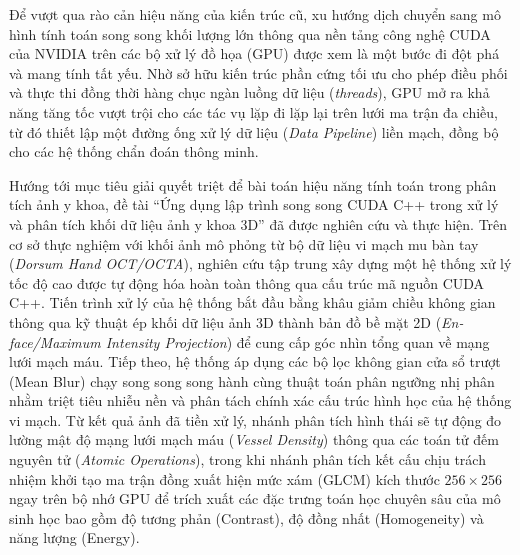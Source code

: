 Để vượt qua rào cản hiệu năng của kiến trúc cũ, xu hướng dịch chuyển sang mô hình tính toán song song khối lượng lớn thông qua nền tảng công nghệ CUDA của NVIDIA trên các bộ xử lý đồ họa (GPU) được xem là một bước đi đột phá và mang tính tất yếu. Nhờ sở hữu kiến trúc phần cứng tối ưu cho phép điều phối và thực thi đồng thời hàng chục ngàn luồng dữ liệu (\textit{threads}), GPU mở ra khả năng tăng tốc vượt trội cho các tác vụ lặp đi lặp lại trên lưới ma trận đa chiều, từ đó thiết lập một đường ống xử lý dữ liệu (\textit{Data Pipeline}) liền mạch, đồng bộ cho các hệ thống chẩn đoán thông minh.

Hướng tới mục tiêu giải quyết triệt để bài toán hiệu năng tính toán trong phân tích ảnh y khoa, đề tài “Ứng dụng lập trình song song CUDA C++ trong xử lý và phân tích khối dữ liệu ảnh y khoa 3D” đã được nghiên cứu và thực hiện. Trên cơ sở thực nghiệm với khối ảnh mô phỏng từ bộ dữ liệu vi mạch mu bàn tay (\textit{Dorsum Hand OCT/OCTA}), nghiên cứu tập trung xây dựng một hệ thống xử lý tốc độ cao được tự động hóa hoàn toàn thông qua cấu trúc mã nguồn CUDA C++. Tiến trình xử lý của hệ thống bắt đầu bằng khâu giảm chiều không gian thông qua kỹ thuật ép khối dữ liệu ảnh 3D thành bản đồ bề mặt 2D (\textit{En-face/Maximum Intensity Projection}) để cung cấp góc nhìn tổng quan về mạng lưới mạch máu. Tiếp theo, hệ thống áp dụng các bộ lọc không gian cửa sổ trượt (Mean Blur) chạy song song song hành cùng thuật toán phân ngưỡng nhị phân nhằm triệt tiêu nhiễu nền và phân tách chính xác cấu trúc hình học của hệ thống vi mạch. Từ kết quả ảnh đã tiền xử lý, nhánh phân tích hình thái sẽ tự động đo lường mật độ mạng lưới mạch máu (\textit{Vessel Density}) thông qua các toán tử đếm nguyên tử (\textit{Atomic Operations}), trong khi nhánh phân tích kết cấu chịu trách nhiệm khởi tạo ma trận đồng xuất hiện mức xám (GLCM) kích thước $256 \times 256$ ngay trên bộ nhớ GPU để trích xuất các đặc trưng toán học chuyên sâu của mô sinh học bao gồm độ tương phản (Contrast), độ đồng nhất (Homogeneity) và năng lượng (Energy).

